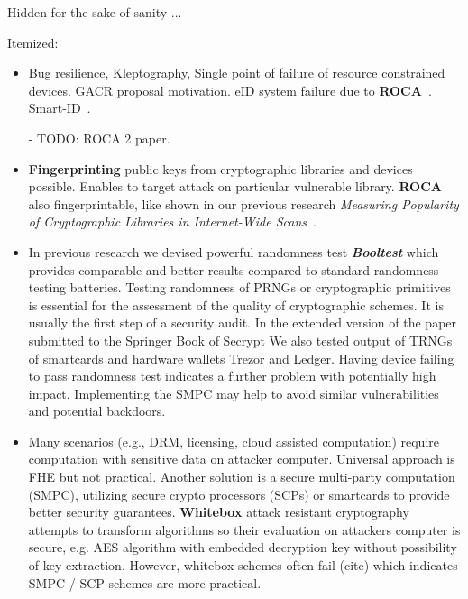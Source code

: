 \documentclass[
  digital, %
  twoside, %
  table,   %
  lof,     %
  lot,     %
]{fithesis3}
\theoremstyle{definition}
\theoremstyle{remark}
\begin{document}
Hidden for the sake of sanity ...
\begin{ecmmnt}  %

Itemized:
\begin{itemize}
	\item Bug resilience, Kleptography, Single point of failure of resource constrained devices. GACR proposal motivation. eID system failure due to {\bf{ROCA}}~\cite{2017-ccs-nemec}. Smart-ID~\cite{smart_id_ee}. 
    
    - TODO: ROCA 2 paper.
        
    \item {\bf{Fingerprinting}} public keys from cryptographic libraries and devices possible. Enables to target attack on particular vulnerable library. {\bf{ROCA}} also fingerprintable, like shown in our previous research {\it{Measuring Popularity of Cryptographic Libraries in Internet-Wide Scans}}~\cite{2017-acsac-nemec}.
    
        \item In previous research we devised powerful randomness test {\bf{\emph{Booltest}}} \cite{booltest_secrypt2017} which provides comparable and better results compared to standard randomness testing batteries. Testing randomness of PRNGs or cryptographic primitives is essential for the assessment of the quality of cryptographic schemes. It is usually the first step of a security audit. In the extended version of the paper submitted to the Springer Book of Secrypt We also tested output of TRNGs of smartcards and hardware wallets Trezor and Ledger. Having device failing to pass randomness test indicates a further problem with potentially high impact. Implementing the SMPC may help to avoid similar vulnerabilities and potential backdoors. 
    
    \item Many scenarios (e.g., DRM, licensing, cloud assisted computation) require computation with sensitive data on attacker computer. Universal approach is FHE but not practical. Another solution is a secure multi-party computation (SMPC), utilizing secure crypto processors (SCPs) or smartcards to provide better security guarantees. {\bf{Whitebox}} attack resistant cryptography \cite{whitebox_klinec_santacrypt2013,Klinec2013thesis} attempts to transform algorithms so their evaluation on attackers computer is secure, e.g. AES algorithm with embedded decryption key without possibility of key extraction. However, whitebox schemes often fail (cite) which indicates SMPC / SCP schemes are more practical.
    

\end{itemize}
\end{ecmmnt}
\end{document}
